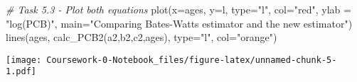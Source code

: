\documentclass[
]{article}
\newenvironment{Shaded}{\begin{snugshade}}{\end{snugshade}}
\newcommand{\AttributeTok}[1]{\textcolor[rgb]{0.77,0.63,0.00}{#1}}
\newcommand{\CommentTok}[1]{\textcolor[rgb]{0.56,0.35,0.01}{\textit{#1}}}
\newcommand{\FunctionTok}[1]{\textcolor[rgb]{0.00,0.00,0.00}{#1}}
\newcommand{\NormalTok}[1]{#1}
\newcommand{\StringTok}[1]{\textcolor[rgb]{0.31,0.60,0.02}{#1}}
\begin{document}
\begin{Shaded}
\begin{Highlighting}[]
\CommentTok{\# Task 5.3 {-} Plot both equations}
\FunctionTok{plot}\NormalTok{(}\AttributeTok{x=}\NormalTok{ages, }\AttributeTok{y=}\NormalTok{l, }\AttributeTok{type=}\StringTok{"l"}\NormalTok{, }\AttributeTok{col=}\StringTok{"red"}\NormalTok{, }\AttributeTok{ylab =} \StringTok{"log(PCB)"}\NormalTok{, }\AttributeTok{main=}\StringTok{"Comparing Bates{-}Watts estimator and the new estimator"}\NormalTok{)}
\FunctionTok{lines}\NormalTok{(ages, }\FunctionTok{calc\_PCB2}\NormalTok{(a2,b2,c2,ages), }\AttributeTok{type=}\StringTok{"l"}\NormalTok{, }\AttributeTok{col=}\StringTok{"orange"}\NormalTok{)}
\end{Highlighting}
\end{Shaded}

\texttt{[image: Coursework-0-Notebook\_files/figure-latex/unnamed-chunk-5-1.pdf]}
\end{document}
